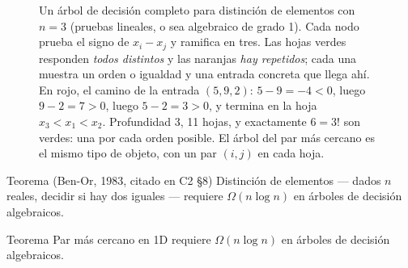 \documentclass[11pt]{article}
\begin{document}
\begin{figure}[!ht]
\caption{Un árbol de decisión completo para distinción de elementos con $n=3$ (pruebas lineales, o sea
algebraico de grado 1). Cada nodo prueba el signo de $x_i-x_j$ y ramifica en tres. Las hojas verdes
responden \emph{todos distintos} y las naranjas \emph{hay repetidos}; cada una muestra un orden o igualdad
y una entrada concreta que llega ahí. En rojo, el camino de la entrada $(5,9,2)$: $5-9=-4<0$, luego
$9-2=7>0$, luego $5-2=3>0$, y termina en la hoja $x_3<x_1<x_2$. Profundidad 3, 11 hojas, y exactamente
$6=3!$ son verdes: una por cada orden posible. El árbol del par más cercano es el mismo tipo de
objeto, con un par $(i,j)$ en cada hoja.}
\label{fig:arbol}
\end{figure}

\begin{resultado}{Teorema (Ben-Or, 1983, citado en C2 §8)}
Distinción de elementos --- dados $n$ reales, decidir si hay dos iguales --- requiere $\Omega(n\log n)$ en
árboles de decisión algebraicos.
\end{resultado}

\begin{resultado}{Teorema}
Par más cercano en 1D requiere $\Omega(n\log n)$ en árboles de decisión algebraicos.
\end{resultado}
\end{document}
